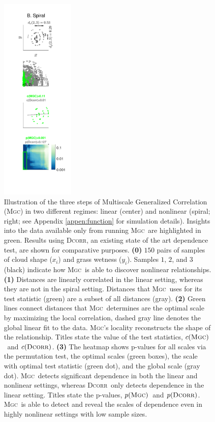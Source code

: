 \documentclass[11pt]{article}
\providecommand{\sct}[1]{{\normalfont\textsc{#1}}}
\newcommand{\GG}{c}
\newcommand{\Mgc}{\sct{Mgc}}
\newcommand{\Dcorr}{\sct{Dcorr}}
\begin{document}
\begin{figure}
\includegraphics[width=0.32\textwidth,height=0.75\textheight,trim={1.95cm 2cm 0.73cm 1.28cm},clip]{Figures/Fig8.pdf}
\caption{Illustration of the three steps of Multiscale Generalized Correlation (\Mgc) in two different regimes: linear (center) and nonlinear (spiral; right; see Appendix \ref{appen:function} for simulation details). Insights into the data available only from running \Mgc~are highlighted in green.  Results using \Dcorr, an existing state of the art dependence test, are shown for comparative purposes. 
\textbf{(0)}  $150$ pairs of samples of cloud shape ($x_i$) and grass wetness ($y_i$). 
Samples $1$, $2$, and $3$ (black) indicate how \Mgc~is able to discover nonlinear relationships. 
% 
\textbf{(1)} Distances are linearly correlated in the linear setting, whereas they are not in the spiral setting.  Distances that \Mgc~uses for its test statistic (green) are a subset of all distances (gray). 
% 
\textbf{(2)} Green lines connect distances that \Mgc~determines are the optimal scale by maximizing the local correlation, 
dashed gray line denotes the global linear fit to the data.  \Mgc's locality reconstructs the shape of the relationship. Titles state the value of the test statistics,  $\GG(\Mgc)$~and $\GG(\Dcorr)$.
% 
\textbf{(3)} %
The heatmap shows p-values for all scales via the permutation test, the optimal scales (green boxes), the scale with optimal test statistic (green dot), and the global scale (gray dot). \Mgc~detects significant dependence in both the linear and nonlinear settings, whereas \Dcorr~only detects dependence in the linear setting.%
Titles state the p-values,  $p(\Mgc)$~and $p(\Dcorr)$.
% 
\Mgc~is able to detect and reveal the scales of dependence even in highly nonlinear settings with low sample sizes.}
\label{f:newschem}
\end{figure}
\end{document}
